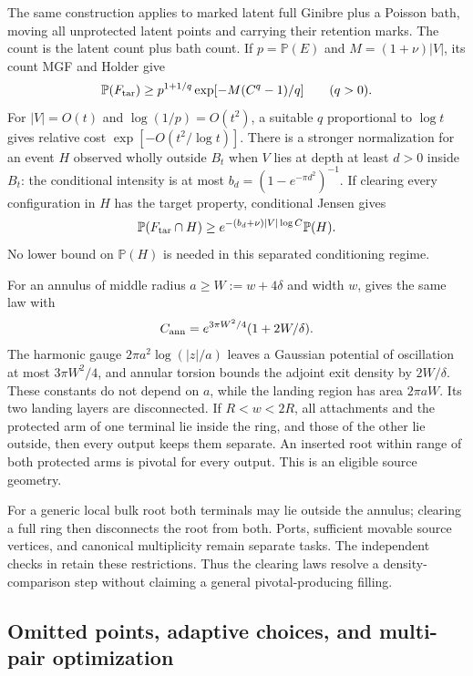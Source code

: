 \documentclass[11pt,a4paper]{article}
\theoremstyle{definition}
\theoremstyle{remark}
\numberwithin{equation}{section}
\begin{document}
The same construction applies to marked latent full Ginibre plus a
Poisson bath, moving all unprotected latent points and carrying their
retention marks. The count is the latent count plus bath count.
If $p=\mathbb P(E)$ and $M=(1+\nu)|V|$, its count MGF and Holder give
\[
 \mathbb P(F_{\rm tar})
       \ge p^{1+1/q}\exp[-M(C^q-1)/q]\qquad(q>0).
\]
For $|V|=O(t)$ and $\log(1/p)=O(t^2)$, a suitable $q$ proportional
to $\log t$ gives relative cost $\exp[-O(t^2/\log t)]$.
There is a stronger normalization for an event $H$ observed wholly
outside $B_t$ when $V$ lies at depth at least $d>0$ inside $B_t$:
the conditional intensity is at most
$b_d=(1-e^{-\pi d^2})^{-1}$. If clearing every configuration in $H$
has the target property, conditional Jensen gives
\[
 \mathbb P(F_{\rm tar}\cap H)
       \ge e^{-(b_d+\nu)|V|\log C}\mathbb P(H).
\]
No lower bound on $\mathbb P(H)$ is needed in this separated
conditioning regime.

For an annulus of middle radius $a\ge W:=w+4\delta$ and width $w$,
 gives the same law with
\begin{equation}\label{br:annular-constant}
 C_{\rm ann}=e^{3\pi W^2/4}(1+2W/\delta).
\end{equation}
The harmonic gauge $2\pi a^2\log(|z|/a)$ leaves a Gaussian potential
of oscillation at most $3\pi W^2/4$, and annular torsion bounds the
adjoint exit density by $2W/\delta$. These constants do not depend
on $a$, while the landing region has area $2\pi aW$.
Its two landing layers are disconnected. If $R<w<2R$, all
attachments and the protected arm of one terminal lie inside the
ring, and those of the other lie outside, then every output keeps
them separate. An inserted root within range of both protected arms
is pivotal for every output. This is an eligible source geometry.

For a generic local bulk root both terminals may lie outside the
annulus; clearing a full ring then disconnects the root from both.
Ports, sufficient movable source vertices, and canonical multiplicity
remain separate tasks. The independent checks in
 retain these restrictions.
Thus the clearing laws resolve a density-comparison step without
claiming a general pivotal-producing filling.

\subsection{Omitted points, adaptive choices, and multi-pair optimization}
\label{br:multipair}
\end{document}
